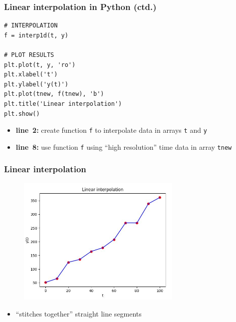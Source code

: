 \documentclass[english,14pt]{beamer}
\begin{document}

\begin{frame}[fragile]

\frametitle{Linear interpolation in Python (ctd.)}

\begin{lstlisting}[style=CStyle,basicstyle=\scriptsize]
# INTERPOLATION
f = interp1d(t, y)

# PLOT RESULTS
plt.plot(t, y, 'ro')
plt.xlabel('t')
plt.ylabel('y(t)')
plt.plot(tnew, f(tnew), 'b')
plt.title('Linear interpolation')
plt.show()
\end{lstlisting}

\begin{itemize}
	\item \textbf{line~2:} create function \texttt{f} to interpolate data in arrays \texttt{t} and \texttt{y}
	\item \textbf{line~8:} use function \texttt{f} using ``high resolution'' time data in array \texttt{tnew}
\end{itemize}

\end{frame}


\begin{frame}[fragile]

\frametitle{Linear interpolation}

\vspace*{-3mm}
\begin{figure}[ht]
	\centering
	\includegraphics[width=0.7\textwidth]{figures/Week6MonLinearInterp}
\end{figure}
\vspace*{-5mm}
\begin{itemize}
	\item ``stitches together'' straight line segments
\end{itemize}

\end{frame}
\end{document}
